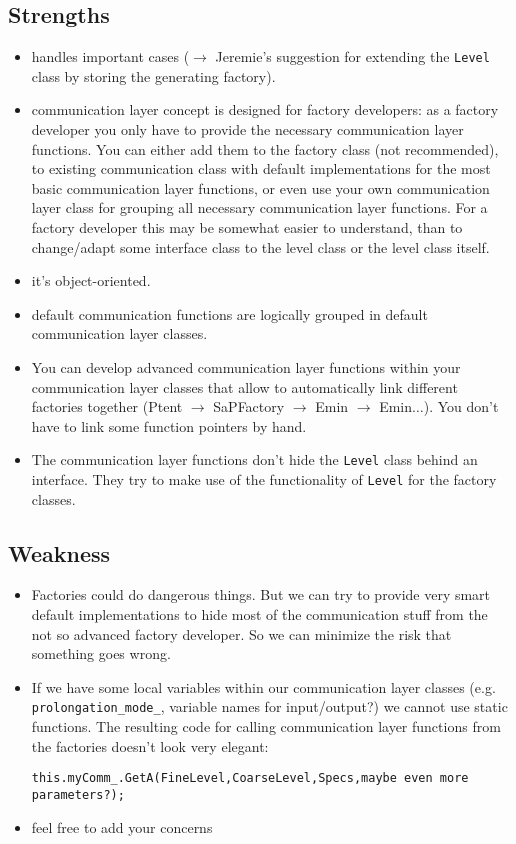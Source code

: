 \subsection{Strengths}
\begin{itemize}
 \item handles important cases ($\rightarrow$ Jeremie's suggestion for extending the \verb|Level| class by storing the generating factory).
 \item communication layer concept is designed for factory developers: as a factory developer you only have to provide the necessary communication layer functions. You can either add them to the factory class (not recommended), to existing communication class with default implementations for the most basic communication layer functions, or even use your own communication layer class for grouping all necessary communication layer functions. For a factory developer this may be somewhat easier to understand, than to change/adapt some interface class to the level class or the level class itself.
 \item it's object-oriented.
 \item default communication functions are logically grouped in default communication layer classes.
 \item You can develop advanced communication layer functions within your communication layer classes that allow to automatically link different factories together (Ptent $\rightarrow$ SaPFactory $\rightarrow$ Emin $\rightarrow$ Emin$\ldots$). You don't have to link some function pointers by hand.
 \item The communication layer functions don't hide the \verb|Level| class behind an interface. They try to make use of the functionality of \verb|Level| for the factory classes.
\end{itemize}

\subsection{Weakness}
\begin{itemize}
 \item Factories could do dangerous things. But we can try to provide very smart default implementations to hide most of the communication stuff from the not so advanced factory developer. So we can minimize the risk that something goes wrong.
 \item If we have some local variables within our communication layer classes (e.g. \verb|prolongation_mode_|, variable names for input/output?) we cannot use static functions. The resulting code for calling communication layer functions from the factories doesn't look very elegant:
\begin{verbatim}
this.myComm_.GetA(FineLevel,CoarseLevel,Specs,maybe even more parameters?);
\end{verbatim}
\item feel free to add your concerns
\end{itemize}

